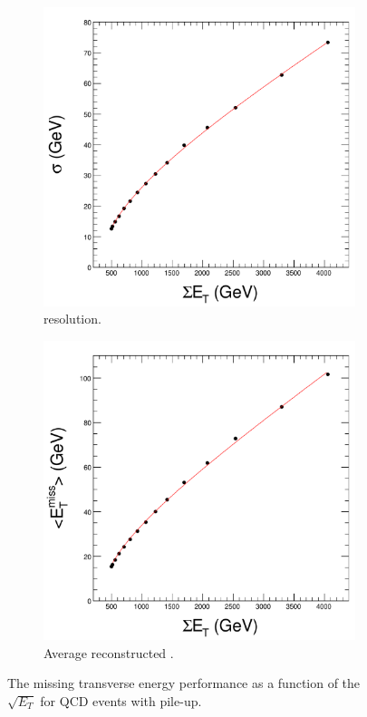 \begin{figure}[htbp]
  \centering
  \begin{subfigure}{0.48\textwidth}
    \centering
    \includegraphics[width=\textwidth]{met_res}
    \caption{\ETm resolution.}
    \label{fig:met_res}
  \end{subfigure}
  \begin{subfigure}{0.48\textwidth}
    \centering
    \includegraphics[width=\textwidth]{met_mean}
    \caption{Average reconstructed \ETm.}
    \label{fig:met_mean}
  \end{subfigure}
  \caption{ The missing transverse energy performance as a function of the
            $\sqrt{E_T}$ for QCD events with pile-up.  }
\label{fig:met_performance} 
\end{figure}

